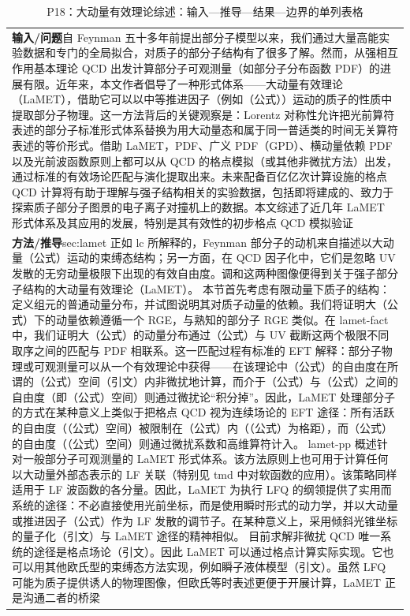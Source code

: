 \documentclass[UTF8,11pt,oneside]{ctexbook}
\begin{document}
\begin{table}[htbp]
  \centering
  \caption*{P18：大动量有效理论综述：输入—推导—结果—边界的单列表格}
  \small
  \begin{tabular}{@{}p{}@{}}
    \toprule
    \textbf{输入/问题}\quad 自 Feynman 五十多年前提出部分子模型以来，我们通过大量高能实验数据和专门的全局拟合，对质子的部分子结构有了很多了解。然而，从强相互作用基本理论 QCD 出发计算部分子可观测量（如部分子分布函数 PDF）的进展有限。近年来，本文作者倡导了一种形式体系——大动量有效理论（LaMET），借助它可以以中等推进因子（例如（公式））运动的质子的性质中提取部分子物理。这一方法背后的关键观察是：Lorentz 对称性允许把光前算符表述的部分子标准形式体系替换为用大动量态和属于同一普适类的时间无关算符表述的等价形式。借助 LaMET，PDF、广义 PDF（GPD）、横动量依赖 PDF 以及光前波函数原则上都可以从 QCD 的格点模拟（或其他非微扰方法）出发，通过标准的有效场论匹配与演化提取出来。未来配备百亿亿次计算设施的格点 QCD 计算将有助于理解与强子结构相关的实验数据，包括即将建成的、致力于探索质子部分子图景的电子离子对撞机上的数据。本文综述了近几年 LaMET 形式体系及其应用的发展，特别是其有效性的初步格点 QCD 模拟验证 \\
    \textbf{方法/推导}\quad sec:lamet 正如 lc 所解释的，Feynman 部分子的动机来自描述以大动量（公式）运动的束缚态结构；另一方面，在 QCD 因子化中，它们是忽略 UV 发散的无穷动量极限下出现的有效自由度。调和这两种图像便得到关于强子部分子结构的大动量有效理论（LaMET）。 本节首先考虑有限动量下质子的结构：定义组元的普通动量分布，并试图说明其对质子动量的依赖。我们将证明大（公式）下的动量依赖遵循一个 RGE，与熟知的部分子 RGE 类似。在 lamet-fact 中，我们证明大（公式）的动量分布通过（公式）与 UV 截断这两个极限不同取序之间的匹配与 PDF 相联系。这一匹配过程有标准的 EFT 解释：部分子物理或可观测量可以从一个有效理论中获得——在该理论中（公式）的自由度在所谓的（公式）空间（引文）内非微扰地计算，而介于（公式）与（公式）之间的自由度（即（公式）空间）则通过微扰论``积分掉''。因此，LaMET 处理部分子的方式在某种意义上类似于把格点 QCD 视为连续场论的 EFT 途径：所有活跃的自由度（（公式）空间）被限制在（公式）内（（公式）为格距），而（公式）的自由度（（公式）空间）则通过微扰系数和高维算符计入。 lamet-pp 概述针对一般部分子可观测量的 LaMET 形式体系。该方法原则上也可用于计算任何以大动量外部态表示的 LF 关联（特别见 tmd 中对软函数的应用）。该策略同样适用于 LF 波函数的各分量。因此，LaMET 为执行 LFQ 的纲领提供了实用而系统的途径：不必直接使用光前坐标，而是使用瞬时形式的动力学，并以大动量或推进因子（公式）作为 LF 发散的调节子。在某种意义上，采用倾斜光锥坐标的量子化（引文）与 LaMET 途径的精神相似。 目前求解非微扰 QCD 唯一系统的途径是格点场论（引文）。因此 LaMET 可以通过格点计算实际实现。它也可以用其他欧氏型的束缚态方法实现，例如瞬子液体模型（引文）。虽然 LFQ 可能为质子提供诱人的物理图像，但欧氏等时表述更便于开展计算，LaMET 正是沟通二者的桥梁 \\

\end{tabular}
\end{table}
\end{document}
